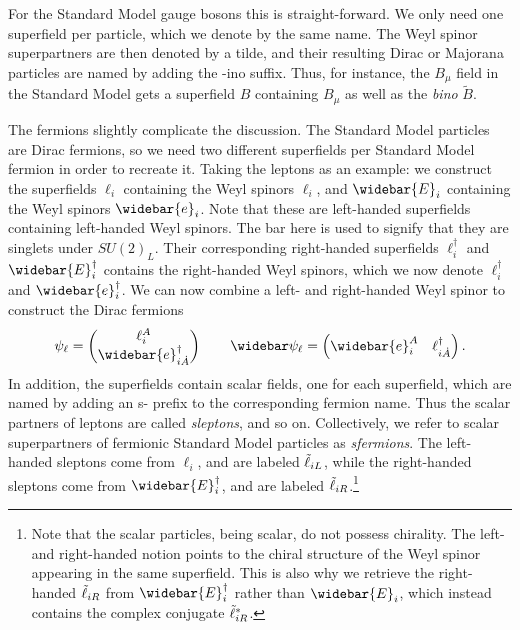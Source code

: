 For the Standard Model gauge bosons this is straight-forward. We only need one superfield per particle, which we denote by the same name. The Weyl spinor superpartners are then denoted by a tilde, and their resulting Dirac or Majorana particles are named by adding the -ino suffix. Thus, for instance, the $B_\mu$ field in the Standard Model gets a superfield $B$ containing $B_\mu$ as well as the \emph{bino} $\tilde{B}$.

The fermions slightly complicate the discussion. The Standard Model particles are Dirac fermions, so we need two different superfields per Standard Model fermion in order to recreate it. Taking the leptons as an example: we construct the superfields $\ell_i$ containing the Weyl spinors $\ell_i$, and $\widebar{E}_i$ containing the Weyl spinors $\widebar{e}_i$. Note that these are left-handed superfields containing left-handed Weyl spinors. The bar here is used to signify that they are singlets under $SU(2)_L$. Their corresponding right-handed superfields $\ell_i^\dagger$ and $\widebar{E}_i^\dagger$ contains the right-handed Weyl spinors, which we now denote $\ell_i^\dagger$ and $\widebar{e}_i^\dagger$.
We can now combine a left- and right-handed Weyl spinor to construct the Dirac fermions
\begin{equation}
    \psi_\ell = \begin{pmatrix}
        \ell_i^A \\ \widebar{e}^\dagger_{i\dot{A}}
    \end{pmatrix} \qquad
    \widebar\psi_\ell = \begin{pmatrix}
        \widebar{e}_i^A & \ell^\dagger_{i\dot{A}}
    \end{pmatrix}.
\end{equation}
In addition, the superfields contain scalar fields, one for each superfield, which are named by adding an s- prefix to the corresponding fermion name. Thus the scalar partners of leptons are called \emph{sleptons}, and so on. Collectively, we refer to scalar superpartners of fermionic Standard Model particles as \emph{sfermions}.
The left-handed sleptons come from $\ell_i$, and are labeled ${\tilde{\ell}}_{iL}$, while the right-handed sleptons come from $\widebar{E}_i^\dagger$, and are labeled ${\tilde{\ell}}_{iR}$.\footnote{Note that the scalar particles, being scalar, do not possess chirality. The left- and right-handed notion points to the chiral structure of the Weyl spinor appearing in the same superfield. This is also why we retrieve the right-handed ${\tilde{\ell}}_{iR}$ from $\widebar{E}_i^\dagger$ rather than $\widebar{E}_i$, which instead contains the complex conjugate ${\tilde{\ell}}_{iR}^*$.}

